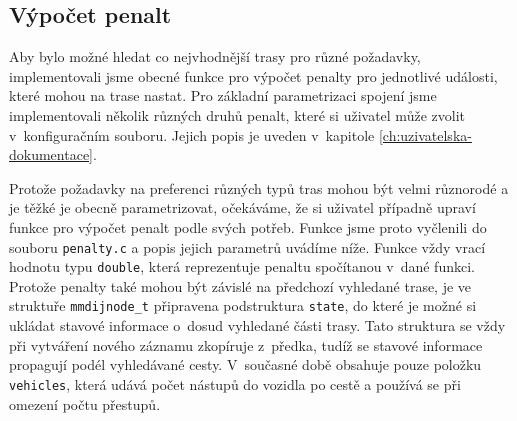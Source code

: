 \subsection{Výpočet penalt}
Aby bylo možné hledat co nejvhodnější trasy pro různé požadavky, implementovali
jsme obecné funkce pro výpočet penalty pro jednotlivé události, které mohou na
trase nastat. Pro základní parametrizaci spojení jsme implementovali několik
různých druhů penalt, které si uživatel může zvolit v~konfiguračním souboru.
Jejich popis je uveden v~kapitole \ref{ch:uzivatelska-dokumentace}.  

Protože požadavky na preferenci různých typů tras mohou být velmi
různorodé a je těžké je obecně parametrizovat, očekáváme, že si uživatel
případně upraví funkce pro výpočet penalt podle svých potřeb. Funkce jsme proto
vyčlenili do souboru {\tt penalty.c} a popis jejich parametrů uvádíme níže.
Funkce vždy vrací hodnotu typu {\tt double}, která reprezentuje penaltu
spočítanou v~dané funkci. Protože penalty také mohou být závislé na předchozí
vyhledané trase, je ve struktuře {\tt mmdijnode\_t} připravena podstruktura
{\tt state}, do které je možné si ukládat stavové informace o~dosud vyhledané
části trasy. Tato struktura se vždy při vytváření nového záznamu zkopíruje
z~předka, tudíž se stavové informace propagují podél vyhledávané cesty. V~současné
době obsahuje pouze položku {\tt vehicles}, která udává počet nástupů do vozidla
po cestě a používá se při omezení počtu přestupů. 


